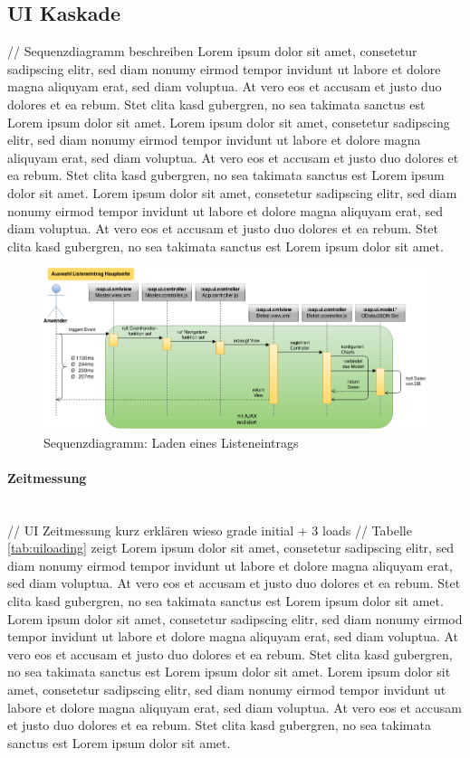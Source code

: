 \subsection{UI Kaskade}
// Sequenzdiagramm beschreiben
Lorem ipsum dolor sit amet, consetetur sadipscing elitr, sed diam nonumy eirmod tempor invidunt ut labore et dolore magna aliquyam erat, sed diam voluptua. At vero eos et accusam et justo duo dolores et ea rebum. Stet clita kasd gubergren, no sea takimata sanctus est Lorem ipsum dolor sit amet. Lorem ipsum dolor sit amet, consetetur sadipscing elitr, sed diam nonumy eirmod tempor invidunt ut labore et dolore magna aliquyam erat, sed diam voluptua. At vero eos et accusam et justo duo dolores et ea rebum. Stet clita kasd gubergren, no sea takimata sanctus est Lorem ipsum dolor sit amet. Lorem ipsum dolor sit amet, consetetur sadipscing elitr, sed diam nonumy eirmod tempor invidunt ut labore et dolore magna aliquyam erat, sed diam voluptua. At vero eos et accusam et justo duo dolores et ea rebum. Stet clita kasd gubergren, no sea takimata sanctus est Lorem ipsum dolor sit amet. 

\vspace{1em}
\begin{figure}[htb]
  \centering
  \includegraphics[width=0.95\linewidth,angle=90]{abb/sapui5_load_list_entry}
  \caption[Sequenzdiagramm: Laden eines Listeneintrags]{Sequenzdiagramm: Laden eines Listeneintrags}
  \label{fig:sequenzdiagramm}
\end{figure}

\paragraph{Zeitmessung}$\;$ \\
// UI Zeitmessung kurz erklären wieso grade initial + 3 loads
// Tabelle \ref{tab:uiloading} zeigt
Lorem ipsum dolor sit amet, consetetur sadipscing elitr, sed diam nonumy eirmod tempor invidunt ut labore et dolore magna aliquyam erat, sed diam voluptua. At vero eos et accusam et justo duo dolores et ea rebum. Stet clita kasd gubergren, no sea takimata sanctus est Lorem ipsum dolor sit amet. Lorem ipsum dolor sit amet, consetetur sadipscing elitr, sed diam nonumy eirmod tempor invidunt ut labore et dolore magna aliquyam erat, sed diam voluptua. At vero eos et accusam et justo duo dolores et ea rebum. Stet clita kasd gubergren, no sea takimata sanctus est Lorem ipsum dolor sit amet. Lorem ipsum dolor sit amet, consetetur sadipscing elitr, sed diam nonumy eirmod tempor invidunt ut labore et dolore magna aliquyam erat, sed diam voluptua. At vero eos et accusam et justo duo dolores et ea rebum. Stet clita kasd gubergren, no sea takimata sanctus est Lorem ipsum dolor sit amet. 

